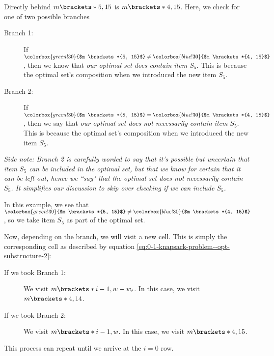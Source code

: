 Directly behind \colorbox{green!30}{$m \brackets*{5, 15}$} is \colorbox{blue!30}{$m \brackets*{4, 15}$}. Here, we check for one of two possible branches
\begin{pindent}
    \begin{description}
        \item[Branch 1:] If $\colorbox{green!30}{$m \brackets*{5, 15}$} \ne \colorbox{blue!30}{$m \brackets*{4, 15}$}$, then we know that \emph{our optimal set does contain item $S_5$}. This is because the optimal set's composition  when we introduced the new item $S_5$.
        \item[Branch 2:] If $\colorbox{green!30}{$m \brackets*{5, 15}$} = \colorbox{blue!30}{$m \brackets*{4, 15}$}$, then we say that \emph{our optimal set does not necessarily contain item $S_5$}. This is because the optimal set's composition  when we introduced the new item $S_5$.
    \end{description}
\end{pindent}

{\footnotesize\emph{Side note: Branch 2 is carefully worded to say that it's possible but uncertain that item $S_5$ can be included in the optimal set, but that we know for certain that it can be left out, hence we ``say" that the optimal set does not necessarily contain $S_5$. It simplifies our discussion to skip over checking if we can include $S_5$.}}

In this example, we see that $\colorbox{green!30}{$m \brackets*{5, 15}$} \ne \colorbox{blue!30}{$m \brackets*{4, 15}$}$, so we take item $S_5$ as part of the optimal set.

Now, depending on the branch, we will visit a new cell. This is simply the corresponding cell as described by equation \eqref{eq:0-1-knapsack-problem--opt-substructure-2}:
\begin{pindent}
    \begin{description}
        \item[If we took Branch 1:] We visit $m \brackets*{i - 1, w - w_i}$. In this case, we visit \colorbox{red!30}{$m \brackets*{4, 14}$}.
        \item[If we took Branch 2:] We visit $m \brackets*{i - 1, w}$. In this case, we visit \colorbox{blue!30}{$m \brackets*{4, 15}$}.
    \end{description}
\end{pindent}

This process can repeat until we arrive at the $i = 0$ row.

